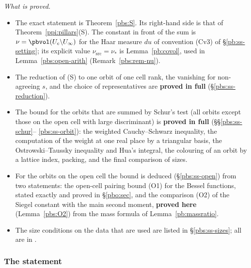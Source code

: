\documentclass[10pt]{amsart}
\theoremstyle{definition}
\theoremstyle{remark}
\begin{document}
\emph{What is proved.}
\begin{itemize}
\item[(1)] The exact statement is Theorem~\ref{pbs:S}. Its right-hand side is that of
Theorem~\ref{ppi:pillars}(S). The constant in front of the sum is $\nu=\pbvol(U_c\backslash
U_\infty)$ for the Haar measure $du$ of convention (Cv3) of \S\ref{pb:ss-setting}; its explicit value
$\nu_{\mathrm{src}}=\nu_*$ is Lemma~\ref{pb:covol}, used in Lemma~\ref{pbs:open-arith}
(Remark~\ref{pbs:rem-nu}).
\item[(2)] The reduction of (S) to one orbit of one cell rank, the vanishing for non-agreeing $s$,
and the choice of representatives are \textbf{proved in full} (\S\ref{pbs:ss-reduction}).
\item[(3)] The bound for the orbits that are summed by Schur's test (all orbits except those on the
open cell with large discriminant) is \textbf{proved in full} (\S\S\ref{pbs:ss-schur}--%
\ref{pbs:ss-orbit}): the weighted Cauchy--Schwarz inequality, the computation of the weight at one
real place by a triangular basis, the Ostrowski--Taussky inequality and Hua's integral, the
colouring of an orbit by a lattice index, packing, and the final comparison of sizes.
\item[(4)] For the orbits on the open cell the bound is deduced (\S\ref{pbs:ss-open}) from two
statements: the open-cell pairing bound (O1) for the Bessel functions, stated exactly and
proved in \S\ref{pbo:sec}, and the comparison (O2) of the Siegel constant with the main second
moment, \textbf{proved here} (Lemma~\ref{pbs:O2}) from the mass formula of
Lemma~\ref{pb:massratio}.
\item[(5)] The size conditions on the data that are used are listed in \S\ref{pbs:ss-sizes};
all are in {\cite[Lemma~13.4]{P46}}.
\end{itemize}

\subsubsection{The statement}\label{pbs:ss-statement}
\end{document}
